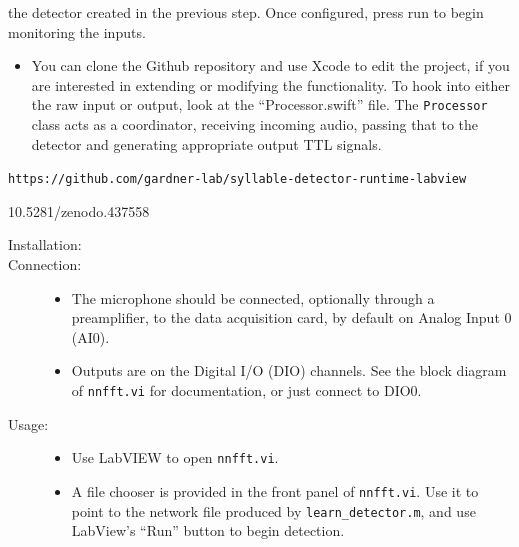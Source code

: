 \documentclass[10pt,letterpaper]{article}
\begin{document}
\begin{description}
\begin{description}
\begin{description}
\begin{itemize}
      the detector created in the previous step. Once configured, press run to begin 
      monitoring the inputs.
      \end{itemize}
    \item[Customisation:]\hfill
      \begin{itemize}
      \item You can clone the Github repository and use Xcode to edit the project, if you 
      are interested in extending or modifying the functionality. To hook into either 
      the raw input or output, look at the ``Processor.swift'' file. The 
      {\tt Processor} class acts as a coordinator, receiving incoming audio, passing that
      to the detector and generating appropriate output TTL signals.
      \end{itemize}
    \end{description}
    
  \item[LabVIEW:]\hfill
    \begin{trivlist}
    \item {\tt https://github.com/gardner-lab/syllable-detector-runtime-labview}
    \item 10.5281/zenodo.437558 
    \end{trivlist}
    \begin{description}
    \item[Installation:]\hfill
    \item[Connection:]\hfill
      \begin{itemize}
      \item The microphone should be connected, optionally through a preamplifier, to the data acquisition card, by default on Analog Input 0 (AI0).
      \item Outputs are on the Digital I/O (DIO) channels.  See the block diagram of {\tt nnfft.vi} for documentation, or just connect to DIO0.
      \end{itemize}
    \item[Usage:]\hfill
      \begin{itemize}
      \item Use LabVIEW to open {\tt nnfft.vi}.
        \item A file chooser is provided in the front panel of {\tt nnfft.vi}.  Use it to point to the network file
      produced by {\tt learn\_detector.m}, and use LabView's ``Run''
      button to begin detection.
      \end{itemize}
    \end{description}
  \end{description}
  
\end{description}


\end{document}
